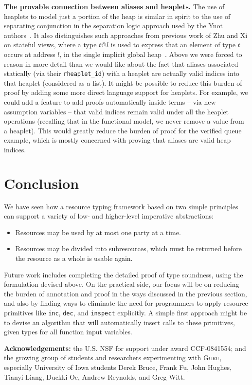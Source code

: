 \documentclass[9pt,natbib]{sigplanconf}
\begin{document}
\textbf{The provable connection between aliases and heaplets.} The use
of heaplets to model just a portion of the heap is similar in spirit
to the use of separating conjunction in the separation logic approach
used by the Ynot authors~\cite{nanevski+08,reynolds02}.  It also
distinguishes such approaches from previous work of Zhu and Xi on
stateful views, where a type $t@l$ is used to express that an element
of type $t$ occurs at address $l$, in the single implicit global
heap~\cite{zhu+05}.  Above we were forced to reason in more detail
than we would like about the fact that aliases associated statically
(via their \texttt{rheaplet\_id}) with a heaplet are actually valid
indices into that heaplet (considered as a list).  It might be
possible to reduce this burden of proof by adding some more direct
language support for heaplets.  For example, we could add a feature to
add proofs automatically inside terms -- via new assumption variables
-- that valid indices remain valid under all the heaplet operations
(recalling that in the functional model, we never remove a value from
a heaplet).  This would greatly reduce the burden of proof for the
verified queue example, which is mostly concerned with proving that
aliases are valid heap indices.

\section{Conclusion}

We have seen how a resource typing framework based on two simple
principles can support a variety of low- and higher-level imperative
abstractions:
\begin{itemize}
\item Resources may be used by at most one party at a time.
\item Resources may be divided into subresources, which must be
  returned before the resource as a whole is usable again.
\end{itemize}
\noindent Future work includes completing the detailed proof of type
soundness, using the formulation devised above. On the practical side,
our focus will be on reducing the burden of annotation and proof in
the ways discussed in the previous section, and also by finding ways
to eliminate the need for programmers to apply resource primitives
like \texttt{inc}, \texttt{dec}, and \texttt{inspect} explicitly.  A
simple first approach might be to devise an algorithm that will
automatically insert calls to these primitives, given types for all
function input variables.

\textbf{Acknowledgements:} the U.S. NSF for support under award
CCF-0841554; and the growing group of students and researchers
experimenting with \textsc{Guru}, especially University of Iowa
students Derek Bruce, Frank Fu, John Hughes, Tianyi Liang, Duckki Oe,
Andrew Reynolds, and Greg Witt.




\end{document}
